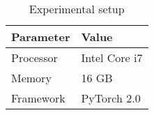 \begin{table}[htbp]
    \centering
    \caption{Experimental setup}
    \label{tab:experimental-setup}
    \begin{tabular}{ll}
        \toprule
            \textbf{Parameter} & \textbf{Value} \\
        \midrule
            Processor          & Intel Core i7  \\
            Memory             & 16 GB          \\
            Framework          & PyTorch 2.0    \\
        \bottomrule
    \end{tabular}
\end{table}
